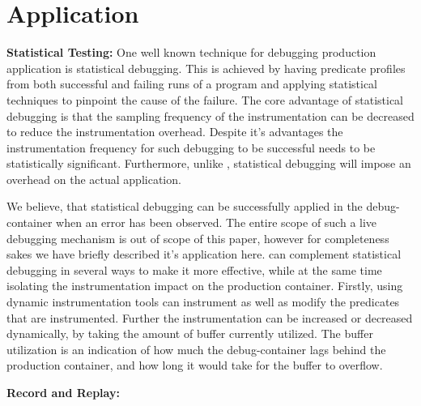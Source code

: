 \section{Application}
\label{statistical}

\textbf{Statistical Testing:}
One well known technique for debugging production application is statistical debugging. 
This is achieved by having predicate profiles from both successful and failing runs of a program and applying statistical techniques to pinpoint the cause of the failure.
The core advantage of statistical debugging is that the sampling frequency of the instrumentation can be decreased to reduce the instrumentation overhead.
Despite it's advantages the instrumentation frequency for such debugging to be successful needs to be statistically significant. 
Furthermore, unlike \parikshan, statistical debugging will impose an overhead on the actual application. 

We believe, that statistical debugging can be successfully applied in the debug-container when an error has been observed. 
The entire scope of such a live debugging mechanism is out of scope of this paper, however for completeness sakes we have briefly described it's application here. 
\parikshan can complement statistical debugging in several ways to make it more effective, while at the same time isolating the instrumentation impact on the production container.
Firstly, using dynamic instrumentation tools \parikshan can instrument as well as modify the predicates that are instrumented.
Further the instrumentation can be increased or decreased dynamically, by taking the amount of buffer currently utilized. 
The buffer utilization is an indication of how much the debug-container lags behind the production container, and how long it would take for the buffer to overflow.

\textbf{Record and Replay:}

\textbf{}